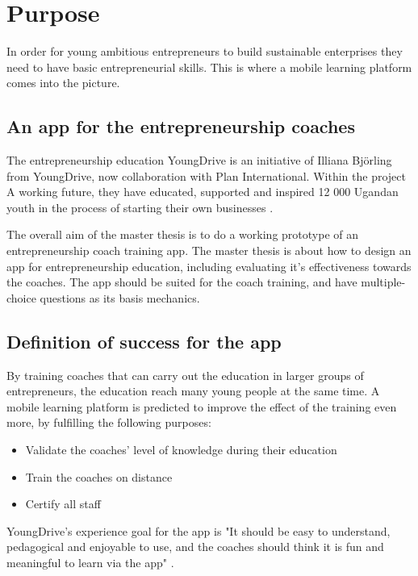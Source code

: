 \section{Purpose}
\label{purpose}

In order for young ambitious entrepreneurs to build sustainable enterprises they need to have basic entrepreneurial skills. This is where a mobile learning platform comes into the picture.

\subsection{An app for the entrepreneurship coaches}
The entrepreneurship education YoungDrive is an initiative of Illiana Björling from YoungDrive, now collaboration with Plan International. Within the project A working future, they have educated, supported and inspired 12 000 Ugandan youth in the process of starting their own businesses \citep{nissar}.

The overall aim of the master thesis is to do a working prototype of an entrepreneurship coach training app. The master thesis is about how to design an app for entrepreneurship education, including evaluating it's effectiveness towards the coaches. The app should be suited for the coach training, and have multiple-choice questions as its basis mechanics.

\subsection{Definition of success for the app}

By training coaches that can carry out the education in larger groups of entrepreneurs, the education reach many young people at the same time. A mobile learning platform is predicted to improve the effect of the training even more, by fulfilling the following purposes:

\begin{itemize}
  \item Validate the coaches' level of knowledge during their education
    \item Train the coaches on distance
    \item Certify all staff
\end{itemize}

YoungDrive's experience goal for the app is "It should be easy to understand, pedagogical and enjoyable to use, and the coaches should think it is fun and meaningful to learn via the app" \citep{youngdrive-masterthesis-idea}.
